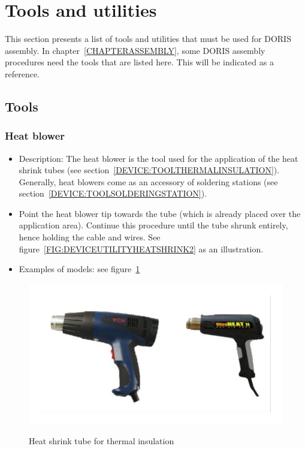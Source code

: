 \section{Tools and utilities}
This section presents a list of tools and utilities that must be used for DORIS assembly. In chapter~\ref{CHAPTERASSEMBLY}, some DORIS assembly procedures need the tools that are listed here. This will be indicated as a reference.
\subsection{Tools}
\subsubsection{Heat blower} \label{DEVICE:TOOLTHERMALBLOWER}
\begin{itemize}
  \item Description: The heat blower is the tool used for the application of the heat shrink tubes (see section~\ref{DEVICE:TOOLTHERMALINSULATION}). Generally, heat blowers come as an accessory of soldering stations (see section~\ref{DEVICE:TOOLSOLDERINGSTATION}).
  \item Point the heat blower tip towards the tube (which is already placed over the application area). Continue this procedure until the tube shrunk entirely, hence holding the cable and wires. See figure~\ref{FIG:DEVICEUTILITYHEATSHRINK2} as an illustration.
  \item Examples of models: see figure~\ref{FIG:DEVICEUTILITYHEATSHRINK}
\end{itemize}
\begin{figure}
  \centering
  \includegraphics[angle=90,width=1\columnwidth]{figs/body02/FIGDEVICEUTILITYHEATSHRINK.pdf}\\
  \caption[Heat shrink tube for thermal insulation]{Heat shrink tube for thermal insulation}
  \label{FIG:DEVICEUTILITYHEATSHRINK}
\end{figure}
